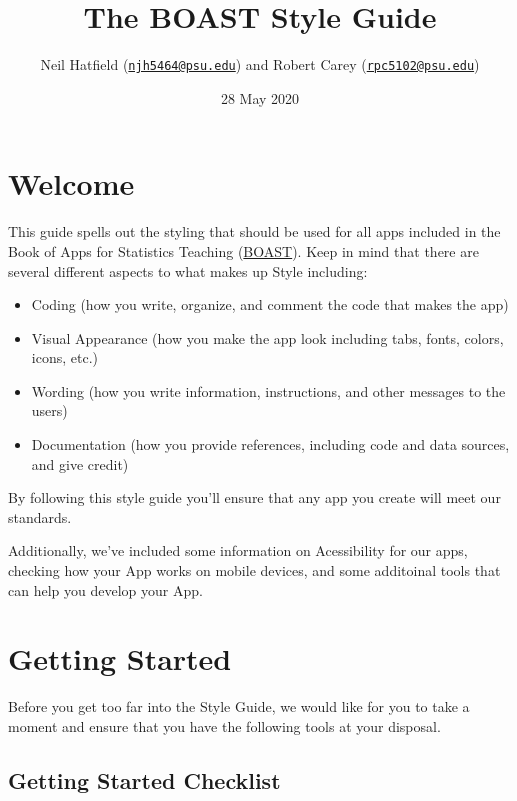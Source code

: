 \documentclass[
]{book}
\title{The BOAST Style Guide}
\author{Neil Hatfield (\href{mailto:njh5464@psu.edu}{\nolinkurl{njh5464@psu.edu}}) and Robert Carey (\href{mailto:rpc5102@psu.edu}{\nolinkurl{rpc5102@psu.edu}})}
\date{28 May 2020}
\providecommand{\tightlist}{%
  \setlength{\itemsep}{0pt}\setlength{\parskip}{0pt}}
\begin{document}
\maketitle

{
\setcounter{tocdepth}{1}
\tableofcontents
}
\hypertarget{welcome}{%
\chapter*{Welcome}\label{welcome}}

This guide spells out the styling that should be used for all apps included in the Book of Apps for Statistics Teaching (\href{https://github.com/EducationShinyAppTeam/BOAST}{BOAST}). Keep in mind that there are several different aspects to what makes up Style including:

\begin{itemize}
\tightlist
\item
  Coding (how you write, organize, and comment the code that makes the app)
\item
  Visual Appearance (how you make the app look including tabs, fonts, colors, icons, etc.)
\item
  Wording (how you write information, instructions, and other messages to the users)
\item
  Documentation (how you provide references, including code and data sources, and give credit)
\end{itemize}

By following this style guide you'll ensure that any app you create will meet our standards.

Additionally, we've included some information on Acessibility for our apps, checking how your App works on mobile devices, and some additoinal tools that can help you develop your App.

\setcounter{chapter}{0}

\hypertarget{getStarted}{%
\chapter{Getting Started}\label{getStarted}}

Before you get too far into the Style Guide, we would like for you to take a moment and ensure that you have the following tools at your disposal.

\hypertarget{checklist}{%
\section{Getting Started Checklist}\label{checklist}}
\end{document}

